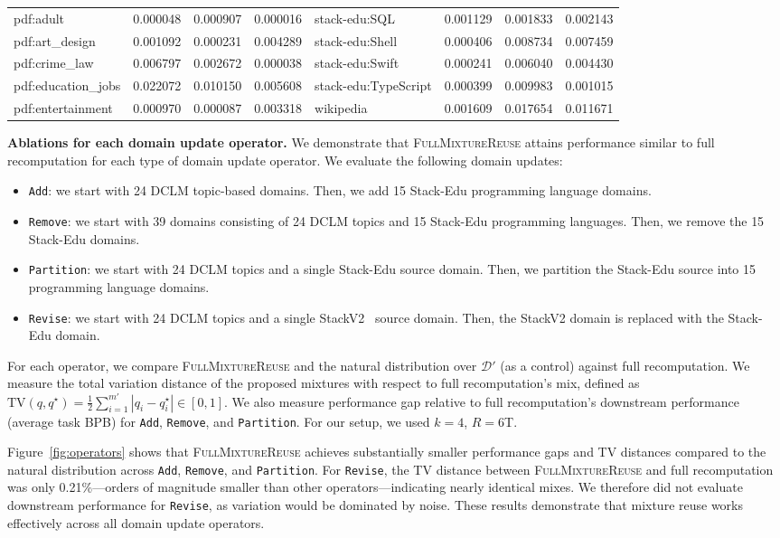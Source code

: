 \documentclass[table]{ai2style/ai2}
\newcommand{\D}[0]{\mathcal{D}}
\newcommand{\fullmixreuse}[0]{\textsc{FullMixtureReuse}\xspace}
\newcommand{\Add}[0]{\texttt{Add}\xspace}
\newcommand{\Remove}[0]{\texttt{Remove}\xspace}
\newcommand{\Partition}[0]{\texttt{Partition}\xspace}
\newcommand{\Revise}[0]{\texttt{Revise}\xspace}
\newcommand{\tv}[0]{\text{TV}}
\begin{document}
\begin{table}[t]
\begin{tabular}{lccc | lccc}
pdf:adult & 0.000048 & 0.000907 & 0.000016 & stack-edu:SQL & 0.001129 & 0.001833 & 0.002143 \\
pdf:art\_design & 0.001092 & 0.000231 & 0.004289 & stack-edu:Shell & 0.000406 & 0.008734 & 0.007459 \\
pdf:crime\_law & 0.006797 & 0.002672 & 0.000038 & stack-edu:Swift & 0.000241 & 0.006040 & 0.004430 \\
pdf:education\_jobs & 0.022072 & 0.010150 & 0.005608 & stack-edu:TypeScript & 0.000399 & 0.009983 & 0.001015 \\
pdf:entertainment & 0.000970 & 0.000087 & 0.003318 & wikipedia & 0.001609 & 0.017654 & 0.011671 \\
\bottomrule
\end{tabular}
\label{tab:full_domain_mixtures}
\end{table}

\textbf{Ablations for each domain update operator.} We demonstrate that \fullmixreuse attains performance similar to full recomputation for each type of domain update operator. We evaluate the following domain updates:
\begin{itemize}
    \item \Add: we start with 24 DCLM topic-based domains. Then, we add 15 Stack-Edu programming language domains.
    \item \Remove: we start with 39 domains consisting of 24 DCLM topics and 15 Stack-Edu programming languages. Then, we remove the 15 Stack-Edu domains.
    \item \Partition: we start with 24 DCLM topics and a single Stack-Edu source domain. Then, we partition the Stack-Edu source into 15 programming language domains. 
    \item \Revise: we start with 24 DCLM topics and a single StackV2~\citep{lozhkov2024starcoder} source domain. Then, the StackV2 domain is replaced with the Stack-Edu domain.
\end{itemize}

For each operator, we compare \fullmixreuse and the natural distribution over $\D'$ (as a control) against full recomputation. We measure the total variation distance of the proposed mixtures with respect to full recomputation's mix, defined as $\tv(q, q^\star) = \frac{1}{2} \sum_{i=1}^{m'} |q_i - q_i^\star| \in [0, 1]$. We also measure performance gap relative to full recomputation's downstream performance (average task BPB) for \Add, \Remove, and \Partition. For our setup, we used $k=4$, $R=6$T.

Figure~\ref{fig:operators} shows that \fullmixreuse achieves substantially smaller performance gaps and TV distances compared to the natural distribution across \Add, \Remove, and \Partition. For \Revise, the TV distance between \fullmixreuse and full recomputation was only 0.21\%---orders of magnitude smaller than other operators---indicating nearly identical mixes. We therefore did not evaluate downstream performance for \Revise, as variation would be dominated by noise. These results demonstrate that mixture reuse works effectively across all domain update operators.
\end{document}
